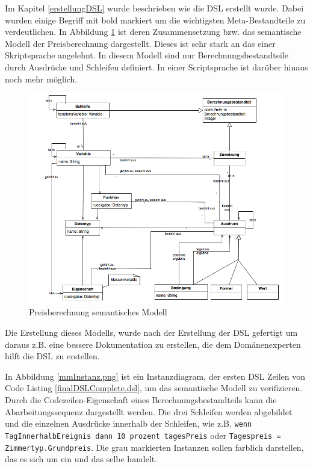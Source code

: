\documentclass[11pt,english,ngerman, headsepline]{scrreprt}
\begin{document}
Im Kapitel \ref{erstellungDSL} wurde beschrieben wie die DSL erstellt wurde.
Dabei wurden einige Begriff mit bold markiert um die wichtigsten
Meta-Bestandteile zu verdeutlichen. In Abbildung \ref{mm.png}
ist deren Zusammensetzung bzw. das semantische Modell der Preisberechnung
dargestellt.
Dieses ist sehr stark an das einer Skriptsprache angelehnt.
In diesem Modell sind nur Berechnungsbestandteile durch Ausdrücke und Schleifen
definiert. In einer Scriptsprache ist darüber hinaus noch mehr möglich.
 
\begin{figure}[h!]
	\begin{center}
	\includegraphics[width=0.99\textwidth]{pics/mm}
	\end{center}
	\caption{Preisberechnung semantisches Modell}
	\label{mm.png}
\end{figure}

Die Erstellung dieses Modells, wurde nach der Erstellung der DSL gefertigt um
daraus z.B. eine bessere Dokumentation zu erstellen, die dem Domänenexperten
hilft die DSL zu erstellen.
  
In Abbildung \ref{mmInstanz.png} ist ein Instanzdiagram, der ersten DSL
Zeilen von Code Listing \ref{finalDSLComplete.dsl}, um das semantische Modell zu
verifizieren.
Durch die Codezeilen-Eigenschaft eines Berechnungsbestandteils kann die
Abarbeitungssequenz dargestellt werden. Die drei Schleifen werden abgebildet und
die einzelnen Ausdrücke innerhalb der Schleifen, wie z.B. \texttt{wenn
TagInnerhalbEreignis dann 10 prozent tagesPreis} oder \texttt{Tagespreis =
Zimmertyp.Grundpreis}. Die grau markierten Instanzen sollen farblich darstellen,
das es sich um ein und das selbe handelt. 
\end{document}
